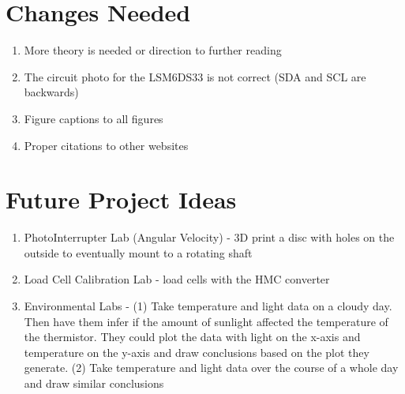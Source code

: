 \section{Changes Needed}
\begin{enumerate}[itemsep=-5pt]
\item More theory is needed or direction to further reading 
\item The circuit photo for the LSM6DS33 is not correct (SDA and SCL are backwards)
\item Figure captions to all figures
\item Proper citations to other websites
\end{enumerate}

\section{Future Project Ideas}
\begin{enumerate}[itemsep=-5pt]
\item PhotoInterrupter Lab (Angular Velocity) - 3D print a disc with holes on the outside to eventually mount to a rotating shaft  
\item Load Cell Calibration Lab - load cells with the HMC converter
\item Environmental Labs - (1) Take temperature and light data on a cloudy day. Then have them infer if the amount of sunlight affected the temperature of the thermistor. They could plot the data with light on the x-axis and temperature on the y-axis and draw conclusions based on the plot they generate. (2) Take temperature and light data over the course of a whole day and draw similar conclusions
\end{enumerate}
